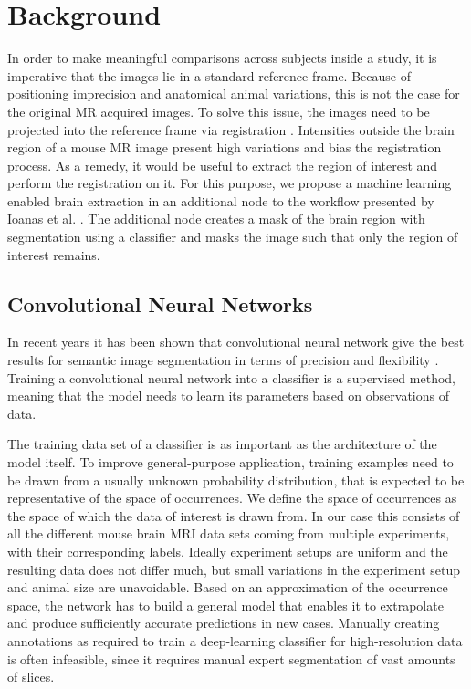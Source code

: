\section{Background}
In order to make meaningful comparisons across subjects inside a study, it is imperative that the images lie in a standard reference frame.
Because of positioning imprecision and anatomical animal variations, this is not the case for the original MR acquired images.
To solve this issue, the images need to be projected into the reference frame via registration \cite{maintz_overview_nodate, sotiras_deformable_2013}. 
Intensities outside the brain region of a mouse MR image present high variations and bias the registration process.
As a remedy, it would be useful to extract the region of interest and perform the registration on it.
For this purpose, we propose a machine learning enabled brain extraction in an additional node to the workflow presented by Ioanas et al. \cite{ioanas_optimized_2019}.
The additional node creates a mask of the brain region with segmentation using a classifier and masks the image such that only the region of interest remains.


\subsection{Convolutional Neural Networks} \label{sec:Convolutional Neural Networks}
In recent years it has been shown that convolutional neural network give the best results for semantic image segmentation in terms of precision and flexibility \cite{geng_survey_2018} \cite{ronneberger_u-net:_2015}.
Training a convolutional neural network into a classifier is a supervised method, meaning that the model needs to learn its parameters based on observations of data.

The training data set of a classifier is as important as the architecture of the model itself.
To improve general-purpose application, training examples need to be drawn from a usually unknown probability distribution, that is expected to be representative of the space of occurrences.
We define the space of occurrences as the space of which the data of interest is drawn from.
In our case this consists of all the different mouse brain MRI data sets coming from multiple experiments, with their corresponding labels. 
Ideally experiment setups are uniform and the resulting data does not differ much, but small variations in the experiment setup and animal size are unavoidable.
Based on an approximation of the occurrence space, the network has to build a general model that enables it to extrapolate and produce sufficiently accurate predictions in new cases.
Manually creating annotations as required to train a deep-learning classifier for high-resolution data is often infeasible, since it requires manual expert segmentation of vast amounts of slices.

